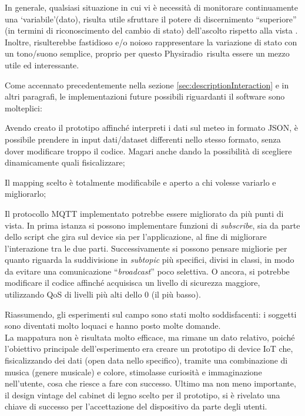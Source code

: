 \documentclass[12pt,a4paper]{report}
\newcommand{\physiradio}{Physiradio} %
\begin{document}
\bigskip

In generale, qualsiasi situazione in cui vi è necessità di monitorare continuamente una `variabile'(dato), risulta utile sfruttare il potere di discernimento ``superiore'' (in termini di riconoscimento del cambio di stato) dell'ascolto rispetto alla vista \cite{10.1117/12.19981}. Inoltre, risulterebbe fastidioso e/o noioso rappresentare la variazione di stato con un tono/suono semplice, proprio per questo \physiradio\ risulta essere un mezzo utile ed interessante. \\

\bigskip

Come accennato precedentemente nella sezione \ref{sec:descriptionInteraction} e in altri paragrafi, le implementazioni future possibili riguardanti il software sono molteplici:
\begin{compactitem}
	\item Avendo creato il prototipo affinché interpreti i dati sul meteo in formato JSON, è possibile prendere in input dati/dataset differenti nello stesso formato, senza dover modificare troppo il codice. Magari anche dando la possibilità di scegliere dinamicamente quali fisicalizzare;
	\item Il mapping scelto è totalmente modificabile e aperto a chi volesse variarlo e migliorarlo;
	\item Il protocollo MQTT implementato potrebbe essere migliorato da più punti di vista. In prima istanza si possono implementare funzioni di \textit{subscribe}, sia da parte dello script che gira sul device sia per l'applicazione, al fine di migliorare l'interazione tra le due parti. Successivamente si possono pensare migliorie per quanto riguarda la suddivisione in \textit{subtopic} più specifici, divisi in classi, in modo da evitare una comunicazione ``\textit{broadcast}'' poco selettiva. O ancora, si potrebbe modificare il codice affinché acquisisca un livello di sicurezza maggiore, utilizzando QoS di livelli più alti dello 0 (il più basso).\\
\end{compactitem}

\bigskip
\newpage
Riassumendo, gli esperimenti sul campo sono stati molto soddisfacenti: i soggetti sono diventati molto loquaci e hanno posto molte domande.\\ La mappatura non è risultata molto efficace, ma rimane un dato relativo, poiché l'obiettivo principale dell'esperimento era creare un prototipo di device IoT che, fisicalizzando dei dati (open data nello specifico), tramite una combinazione di musica (genere musicale) e colore, stimolasse curiosità e immaginazione nell'utente, cosa che riesce a fare con successo.
Ultimo ma non meno importante, il design vintage del cabinet di legno scelto per il prototipo, si è rivelato una chiave di successo per l'accettazione del dispositivo da parte degli utenti.
\end{document}
